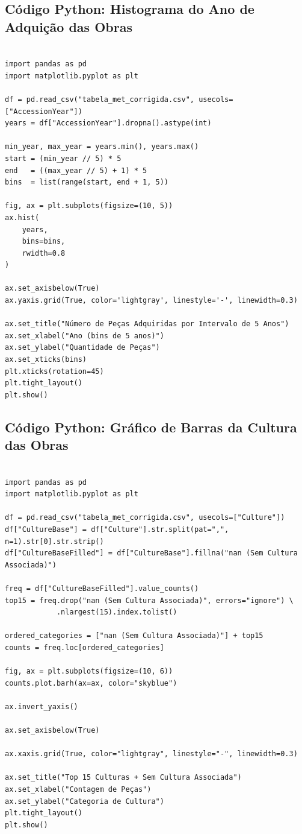 \documentclass[11pt,a4paper]{article}
\begin{document}
\subsection*{Código Python: Histograma do Ano de Adquição das Obras}
\label{anx:codigo_histograma_accession_year}
\begin{verbatim}

import pandas as pd
import matplotlib.pyplot as plt

df = pd.read_csv("tabela_met_corrigida.csv", usecols=["AccessionYear"])
years = df["AccessionYear"].dropna().astype(int)

min_year, max_year = years.min(), years.max()
start = (min_year // 5) * 5
end   = ((max_year // 5) + 1) * 5
bins  = list(range(start, end + 1, 5))

fig, ax = plt.subplots(figsize=(10, 5))
ax.hist(
    years,
    bins=bins,
    rwidth=0.8
)

ax.set_axisbelow(True)
ax.yaxis.grid(True, color='lightgray', linestyle='-', linewidth=0.3)

ax.set_title("Número de Peças Adquiridas por Intervalo de 5 Anos")
ax.set_xlabel("Ano (bins de 5 anos)")
ax.set_ylabel("Quantidade de Peças")
ax.set_xticks(bins)
plt.xticks(rotation=45)
plt.tight_layout()
plt.show()
\end{verbatim}

\subsection*{Código Python: Gráfico de Barras da Cultura das Obras}
\label{anx:codigo_barplot_culture}
\begin{verbatim}

import pandas as pd
import matplotlib.pyplot as plt

df = pd.read_csv("tabela_met_corrigida.csv", usecols=["Culture"])
df["CultureBase"] = df["Culture"].str.split(pat=",", n=1).str[0].str.strip()
df["CultureBaseFilled"] = df["CultureBase"].fillna("nan (Sem Cultura Associada)")

freq = df["CultureBaseFilled"].value_counts()
top15 = freq.drop("nan (Sem Cultura Associada)", errors="ignore") \
            .nlargest(15).index.tolist()

ordered_categories = ["nan (Sem Cultura Associada)"] + top15
counts = freq.loc[ordered_categories]

fig, ax = plt.subplots(figsize=(10, 6))
counts.plot.barh(ax=ax, color="skyblue")

ax.invert_yaxis()

ax.set_axisbelow(True)

ax.xaxis.grid(True, color="lightgray", linestyle="-", linewidth=0.3)

ax.set_title("Top 15 Culturas + Sem Cultura Associada")
ax.set_xlabel("Contagem de Peças")
ax.set_ylabel("Categoria de Cultura")
plt.tight_layout()
plt.show()
\end{verbatim}
\end{document}

